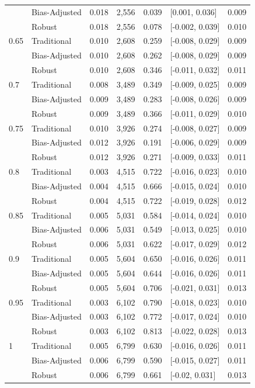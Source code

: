 \documentclass[
  12pt,
]{article}
\begin{document}
\begin{singlespace}
\begin{table}[H]
\begin{tabular}[t]{llrlrlr}
 & Bias-Adjusted & 0.018 & 2,556 & 0.039 & {}[0.001, 0.036] & 0.009\\
 & Robust & 0.018 & 2,556 & 0.078 & {}[-0.002, 0.039] & 0.010\\
0.65 & Traditional & 0.010 & 2,608 & 0.259 & {}[-0.008, 0.029] & 0.009\\
 & Bias-Adjusted & 0.010 & 2,608 & 0.262 & {}[-0.008, 0.029] & 0.009\\
 & Robust & 0.010 & 2,608 & 0.346 & {}[-0.011, 0.032] & 0.011\\
0.7 & Traditional & 0.008 & 3,489 & 0.349 & {}[-0.009, 0.025] & 0.009\\
 & Bias-Adjusted & 0.009 & 3,489 & 0.283 & {}[-0.008, 0.026] & 0.009\\
 & Robust & 0.009 & 3,489 & 0.366 & {}[-0.011, 0.029] & 0.010\\
0.75 & Traditional & 0.010 & 3,926 & 0.274 & {}[-0.008, 0.027] & 0.009\\
 & Bias-Adjusted & 0.012 & 3,926 & 0.191 & {}[-0.006, 0.029] & 0.009\\
 & Robust & 0.012 & 3,926 & 0.271 & {}[-0.009, 0.033] & 0.011\\
0.8 & Traditional & 0.003 & 4,515 & 0.722 & {}[-0.016, 0.023] & 0.010\\
 & Bias-Adjusted & 0.004 & 4,515 & 0.666 & {}[-0.015, 0.024] & 0.010\\
 & Robust & 0.004 & 4,515 & 0.722 & {}[-0.019, 0.028] & 0.012\\
0.85 & Traditional & 0.005 & 5,031 & 0.584 & {}[-0.014, 0.024] & 0.010\\
 & Bias-Adjusted & 0.006 & 5,031 & 0.549 & {}[-0.013, 0.025] & 0.010\\
 & Robust & 0.006 & 5,031 & 0.622 & {}[-0.017, 0.029] & 0.012\\
0.9 & Traditional & 0.005 & 5,604 & 0.650 & {}[-0.016, 0.026] & 0.011\\
 & Bias-Adjusted & 0.005 & 5,604 & 0.644 & {}[-0.016, 0.026] & 0.011\\
 & Robust & 0.005 & 5,604 & 0.706 & {}[-0.021, 0.031] & 0.013\\
0.95 & Traditional & 0.003 & 6,102 & 0.790 & {}[-0.018, 0.023] & 0.010\\
 & Bias-Adjusted & 0.003 & 6,102 & 0.772 & {}[-0.017, 0.024] & 0.010\\
 & Robust & 0.003 & 6,102 & 0.813 & {}[-0.022, 0.028] & 0.013\\
1 & Traditional & 0.005 & 6,799 & 0.630 & {}[-0.016, 0.026] & 0.011\\
 & Bias-Adjusted & 0.006 & 6,799 & 0.590 & {}[-0.015, 0.027] & 0.011\\
 & Robust & 0.006 & 6,799 & 0.661 & {}[-0.02, 0.031] & 0.013\\
\bottomrule
\end{tabular}
\end{table}
 
\end{singlespace}
\end{document}
